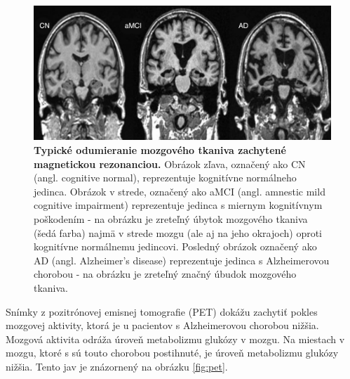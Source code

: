 \begin{figure}[h!]
\centering
\includegraphics[scale=0.3]{assets/images/mri_brain_antrophy.png}
\caption{\textbf{Typické odumieranie mozgového tkaniva zachytené magnetickou rezonanciou.} Obrázok zľava, označený ako CN (angl. cognitive normal), reprezentuje kognitívne normálneho jedinca. Obrázok v strede, označený ako aMCI (angl. amnestic mild cognitive impairment) reprezentuje jedinca s miernym kognitívnym poškodením - na obrázku je zreteľný úbytok mozgového tkaniva (šedá farba) najmä v strede mozgu (ale aj na jeho okrajoch) oproti kognitívne normálnemu jedincovi. Posledný obrázok označený ako AD (angl. Alzheimer’s disease) reprezentuje jedinca s Alzheimerovou chorobou - na obrázku je zreteľný značný úbudok mozgového tkaniva. \cite{khan2016biomarkers}
} 
\label{fig:mri_brain_antrophy}
\end{figure}

Snímky z pozitrónovej emisnej tomografie (PET) dokážu zachytiť pokles mozgovej aktivity, ktorá je u pacientov s Alzheimerovou chorobou nižšia. Mozgová aktivita odráža úroveň metabolizmu glukózy v mozgu. Na miestach v mozgu, ktoré s sú touto chorobou postihnuté, je úroveň metabolizmu glukózy nižšia. Tento jav je znázornený na obrázku \ref{fig:pet}.

